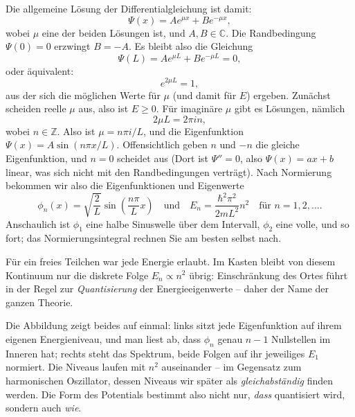 Die allgemeine Lösung der Differentialgleichung ist damit: 
\begin{equation}
	\Psi(x) = A e^{\mu x} + B e^{-\mu x},
\end{equation}
wobei $\mu$ eine der beiden Lösungen ist, und $A,B \in \mathbb{C}$. Die Randbedingung $\Psi(0)= 0$ erzwingt $B = -A$. Es bleibt also die Gleichung 
\begin{equation}
	\Psi(L) =A e^{\mu L} + B e^{-\mu L} = 0,
\end{equation}
oder äquivalent: 
\begin{equation}
	e^{2\mu L} = 1,
\end{equation}
aus der sich die möglichen Werte für $\mu$ (und damit für $E$) ergeben. Zunächst scheiden reelle $\mu$ aus,
also ist $E \ge 0$. Für imaginäre $\mu$ gibt es Lösungen, nämlich 
\begin{equation}
	2\mu L = 2\pi i n,
\end{equation}
wobei $n \in \mathbb{Z}$. Also ist $\mu = n\pi i/L$, und die Eigenfunktion $\Psi(x) = A \sin(n\pi x/L)$.
Offensichtlich geben $n$ und $-n$ die gleiche Eigenfunktion, und $n = 0$ scheidet aus (Dort ist $\Psi'' =0$, also $
\Psi(x) = ax+b$ linear, was sich nicht mit den Randbedingungen verträgt). Nach Normierung bekommen wir also die Eigenfunktionen und Eigenwerte
\begin{equation}
	\phi_n(x) = \sqrt{\frac{2}{L}}\sin\left(\frac{n\pi}{L} x\right)\quad \text{und}\quad E_n = \frac{\hbar^2 \pi^2}{2mL^2}n^2\quad \text{für $n=1,2,\ldots$.}
\end{equation}
Anschaulich ist $\phi_1$ eine halbe Sinuswelle über dem Intervall, $\phi_2$ eine volle, und so fort; das Normierungsintegral rechnen Sie am besten selbst nach.

\begin{merksatz}
	Für ein freies Teilchen war jede Energie erlaubt. Im Kasten bleibt von diesem Kontinuum nur die diskrete Folge $E_n\propto n^2$ übrig: Einschränkung des Ortes führt in der Regel zur \emph{Quantisierung} der Energieeigenwerte -- daher der Name der ganzen Theorie.
\end{merksatz}



Die Abbildung zeigt beides auf einmal: links sitzt jede Eigenfunktion auf ihrem
eigenen Energieniveau, und man liest ab, dass $\phi_n$ genau $n-1$ Nullstellen im
Inneren hat; rechts steht das Spektrum, beide Folgen auf ihr jeweiliges $E_1$
normiert. Die Niveaus laufen mit $n^2$ auseinander -- im Gegensatz zum
harmonischen Oszillator, dessen Niveaus wir später als
\emph{gleichabständig} finden werden. Die Form des Potentials bestimmt also nicht
nur, \emph{dass} quantisiert wird, sondern auch \emph{wie}.

